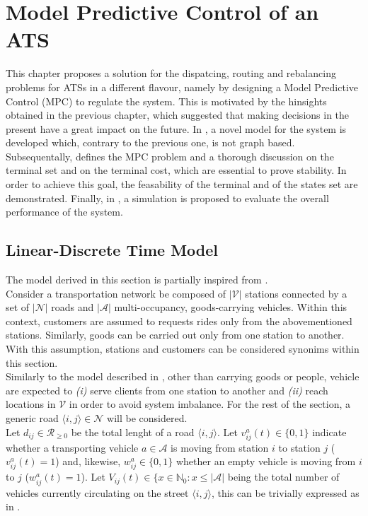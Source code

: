 \chapter{Model Predictive Control of an ATS}\label{ch:mpc}
This chapter proposes a solution for the dispatcing, routing and rebalancing problems for ATSs in a different flavour, namely by designing a Model Predictive Control (MPC) to regulate the system. This is motivated by the hinsights obtained in the previous chapter, which suggested that making decisions in the present have a great impact on the future. In , a novel model for the system is developed which, contrary to the previous one, is not graph based. Subsequentally,  defines the MPC problem and a thorough discussion on the terminal set and on the terminal cost, which are essential to prove stability. In order to achieve this goal, the feasability of the terminal and of the states set are demonstrated. Finally, in , a simulation is proposed to evaluate the overall performance of the system. 
\section{Linear-Discrete Time Model}\label{sec:linear_discrete_time_model}
The model derived in this section is partially inspired from \cite{zhang2016}. \\
Consider a transportation network be composed of $|\mathcal{V}|$ stations connected by a set of $|\mathcal{N}|$ roads and $|\mathcal{A}|$ multi-occupancy, goods-carrying vehicles. Within this context, customers are assumed to requests rides only from the abovementioned stations. Similarly, goods can be carried out only from one station to another. With this assumption, stations and customers can be considered synonims within this section. \\
Similarly to the model described in , other than carrying goods or people, vehicle are expected to \textit{(i)} serve clients from one station to another and \textit{(ii)} reach locations in $\mathcal{V}$ in order to avoid system imbalance. For the rest of the section, a generic road $\langle i,j\rangle \in \mathcal{N}$ will be considered.\\
Let $d_{ij} \in \mathcal{R}_{\ge0}$ be the total lenght of a road $\langle i,j\rangle$. Let $v^a_{ij}(t) \in \{0,1\}$ indicate whether a transporting vehicle $a \in \mathcal{A}$ is moving from station $i$ to station $j$ ($v^a_{ij}(t) = 1$) and, likewise, $w^{a}_{ij}\in \{0,1\} $ whether an empty vehicle is moving from $i$ to $j$ ($w^{a}_{ij}(t)= 1$). Let $V_{ij}(t) \in \{ x \in \mathbb{N}_0 : x \leq |\mathcal{A}|$ being the total number of vehicles currently circulating on the street $\langle i,j\rangle$, this can be trivially expressed as in . \\


